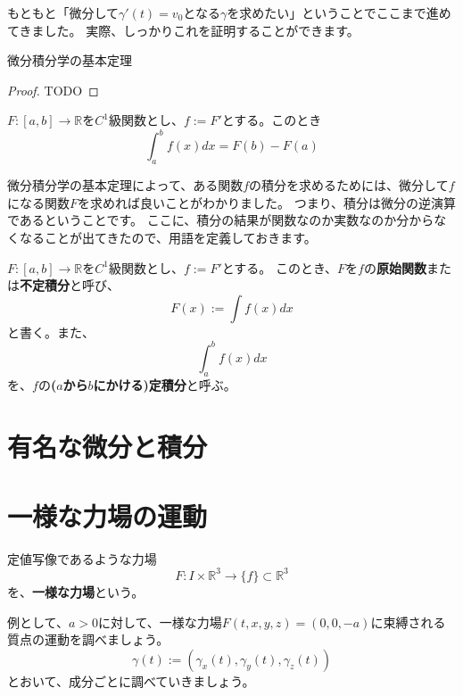 もともと「微分して$\gamma'(t)=v_0$となる$\gamma$を求めたい」ということでここまで進めてきました。
実際、しっかりこれを証明することができます。
\begin{theorem}
  微分積分学の基本定理
\end{theorem}
\begin{proof}
  TODO
\end{proof}
\begin{corollary}
  $F:[a,b]\to\mathbb{R}$を$C^1$級関数とし、$f:=F'$とする。このとき
  \[
    \int_a^b f(x)dx=F(b)-F(a)
  \]
\end{corollary}

微分積分学の基本定理によって、ある関数$f$の積分を求めるためには、微分して$f$になる関数$F$を求めれば良いことがわかりました。
つまり、積分は微分の逆演算であるということです。
ここに、積分の結果が関数なのか実数なのか分からなくなることが出てきたので、用語を定義しておきます。
\begin{definition}
  $F:[a,b]\to\mathbb{R}$を$C^1$級関数とし、$f:=F'$とする。
  このとき、$F$を$f$の\textbf{原始関数}または\textbf{不定積分}と呼び、
  \[
    F(x):=\int f(x)dx
  \]
  と書く。また、
  \[
    \int_a^b f(x)dx
  \]
  を、$f$の\textbf{($a$から$b$にかける)定積分}と呼ぶ。
\end{definition}



\section{有名な微分と積分}



\section{一様な力場の運動}

\begin{definition}
  定値写像であるような力場
  \[
    F:I\times\mathbb{R}^3\to\{f\}\subset\mathbb{R}^3
  \]
  を、\textbf{一様な力場}という。
\end{definition}

例として、$a>0$に対して、一様な力場$F(t,x,y,z)=(0,0,-a)$に束縛される質点の運動を調べましょう。
\[
  \gamma(t):=(\gamma_x(t),\gamma_y(t),\gamma_z(t))
\]
とおいて、成分ごとに調べていきましょう。
